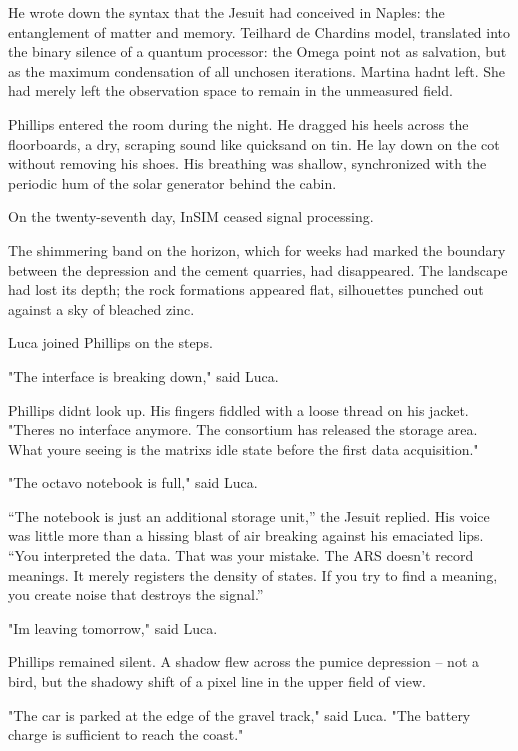 \documentclass[
  ngerman,
]{article}
\begin{document}
He wrote down the syntax that the Jesuit had conceived in Naples: the
entanglement of matter and memory. Teilhard de Chardin\textquotesingle s
model, translated into the binary silence of a quantum processor: the
Omega point not as salvation, but as the maximum condensation of all
unchosen iterations. Martina hadn\textquotesingle t left. She had merely
left the observation space to remain in the unmeasured field.

Phillips entered the room during the night. He dragged his heels across
the floorboards, a dry, scraping sound like quicksand on tin. He lay
down on the cot without removing his shoes. His breathing was shallow,
synchronized with the periodic hum of the solar generator behind the
cabin.

On the twenty-seventh day, InSIM ceased signal processing.

The shimmering band on the horizon, which for weeks had marked the
boundary between the depression and the cement quarries, had
disappeared. The landscape had lost its depth; the rock formations
appeared flat, silhouettes punched out against a sky of bleached zinc.

Luca joined Phillips on the steps.

"The interface is breaking down," said Luca.

Phillips didn\textquotesingle t look up. His fingers fiddled with a
loose thread on his jacket. "There\textquotesingle s no interface
anymore. The consortium has released the storage area. What
you\textquotesingle re seeing is the matrix\textquotesingle s idle state
before the first data acquisition."

"The octavo notebook is full," said Luca.

``The notebook is just an additional storage unit,'' the Jesuit replied.
His voice was little more than a hissing blast of air breaking against
his emaciated lips. ``You interpreted the data. That was your mistake.
The ARS doesn't record meanings. It merely registers the density of
states. If you try to find a meaning, you create noise that destroys the
signal.''

"I\textquotesingle m leaving tomorrow," said Luca.

Phillips remained silent. A shadow flew across the pumice depression --
not a bird, but the shadowy shift of a pixel line in the upper field of
view.

"The car is parked at the edge of the gravel track," said Luca. "The
battery charge is sufficient to reach the coast."
\end{document}
